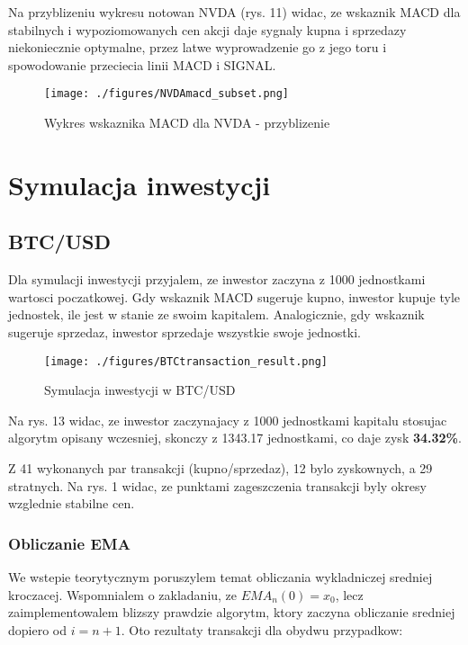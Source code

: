 \documentclass[a4paper,12pt]{article}  %
\begin{document}
Na przyblizeniu wykresu notowan NVDA (rys. 11) widac, ze wskaznik MACD
dla stabilnych i wypoziomowanych cen akcji daje sygnaly kupna i sprzedazy 
niekoniecznie optymalne, przez latwe wyprowadzenie go z jego toru i spowodowanie
przeciecia linii MACD i SIGNAL.

\begin{figure}[H]
  \centering
  \texttt{[image: ./figures/NVDAmacd\_subset.png]}
  \caption{Wykres wskaznika MACD dla NVDA - przyblizenie}
\end{figure}

\pagebreak

\section{Symulacja inwestycji}

\subsection{BTC/USD}

Dla symulacji inwestycji przyjalem, ze inwestor zaczyna z 1000 jednostkami
wartosci poczatkowej. Gdy wskaznik MACD sugeruje kupno, inwestor kupuje
tyle jednostek, ile jest w stanie ze swoim kapitalem. Analogicznie, gdy 
wskaznik sugeruje sprzedaz, inwestor sprzedaje wszystkie swoje jednostki.

\begin{figure}[H]
  \centering
  \texttt{[image: ./figures/BTCtransaction\_result.png]}
  \caption{Symulacja inwestycji w BTC/USD}
\end{figure}

Na rys. 13 widac, ze inwestor zaczynajacy z 1000 jednostkami kapitalu stosujac
algorytm opisany wczesniej, skonczy z 1343.17 jednostkami, co daje zysk
\textbf{34.32\%}.

Z 41 wykonanych par transakcji (kupno/sprzedaz), 12 bylo zyskownych, a 29
stratnych. Na rys. 1 widac, ze punktami zageszczenia transakcji
byly okresy wzglednie stabilne cen.

\subsubsection{Obliczanie EMA}
We wstepie teorytycznym poruszylem temat obliczania wykladniczej sredniej
kroczacej. Wspomnialem o zakladaniu, ze $EMA_{n}(0) = x_0$, lecz
zaimplementowalem blizszy prawdzie algorytm, ktory zaczyna obliczanie
sredniej dopiero od $i = n+1$. Oto rezultaty transakcji dla obydwu przypadkow:
\end{document}

